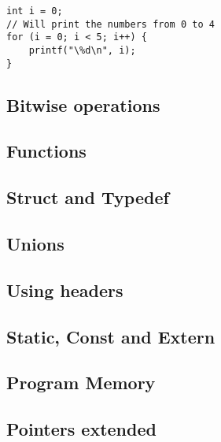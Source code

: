 \begin{lstlisting}[style=CStyle,caption={For loop}]
int i = 0;
// Will print the numbers from 0 to 4
for (i = 0; i < 5; i++) {
    printf("\%d\n", i);
}

\end{lstlisting}


\subsection{Bitwise operations}


\subsection{Functions}


\subsection{Struct and Typedef}


\subsection{Unions}


\subsection{Using headers}


\subsection{Static, Const and Extern}


\subsection{Program Memory}\label{sec:program-memory}


\subsection{Pointers extended}
